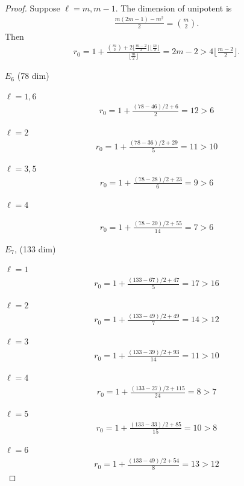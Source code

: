 \documentclass[11pt,a4paper,usenames,dvipsnames,reqno]{amsart}
\numberwithin{equation}{section}
\theoremstyle{definition}
\theoremstyle{remark}
\begin{document}
{\begin{proof}
Suppose $\ell=m,m-1$. The dimension of unipotent is
\begin{align*}
     \frac{m(2m-1)-m^2}{2}=\binom{m}{2}.
\end{align*}
Then
\begin{align*}
    r_0=1+\frac{\binom{m}{2}+ 2\lfloor \frac{m-2}{2}\rfloor\lfloor \frac{m}{2}\rfloor}{\lfloor \frac{m}{2}\rfloor}=2m-2>4\lfloor \frac{m-2}{2}\rfloor.
\end{align*}


$E_6$ (78 dim)

$\ell=1,6$
\begin{align*}
    r_0=1+\frac{(78-46)/2+6}{2}=12>6
\end{align*}

$\ell=2$
\begin{align*}
    r_0=1+\frac{(78-36)/2+29}{5}=11>10
\end{align*}

$\ell=3,5$
\begin{align*}
    r_0=1+\frac{(78-28)/2+23}{6}=9>6
\end{align*}

$\ell=4$

\begin{align*}
    r_0=1+\frac{(78-20)/2+55}{14}=7>6
\end{align*}

$E_7$, (133 dim)

$\ell=1$
\begin{align*}
    r_0=1+\frac{(133-67)/2+47}{5}=17>16
\end{align*}

$\ell=2$
\begin{align*}
    r_0=1+\frac{(133-49)/2+49}{7}=14>12
\end{align*}

$\ell=3$
\begin{align*}
    r_0=1+\frac{(133-39)/2+93}{14}=11>10
\end{align*}

$\ell=4$
\begin{align*}
    r_0=1+\frac{(133-27)/2+115}{24}=8>7
\end{align*}

$\ell=5$
\begin{align*}
    r_0=1+\frac{(133-33)/2+85}{15}=10>8
\end{align*}

$\ell=6$
\begin{align*}
    r_0=1+\frac{(133-49)/2+54}{8}=13>12
\end{align*}


\end{proof}}
\end{document}
